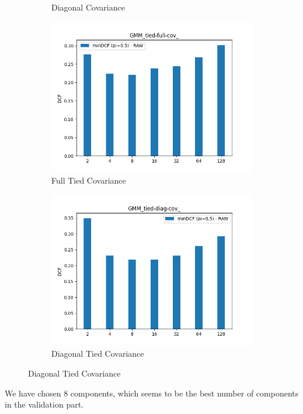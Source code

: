 \documentclass[english]{report}
\begin{document}
\begin{figure}[h!]
\begin{subfigure}{0.3\textwidth}
        \caption{Diagonal Covariance}
    \end{subfigure}
    \begin{subfigure}{0.3\textwidth}
        \includegraphics[scale=0.3]{../../images/evaluation/GMM_tied-full-cov_component_comparison.png}
        \caption{Full Tied Covariance}
    \end{subfigure}
    \begin{subfigure}{0.3\textwidth}
        \includegraphics[scale=0.3]{../../images/evaluation/GMM_tied-diag-cov_component_comparison.png}
        \caption{Diagonal Tied Covariance}
    \end{subfigure}
    \centering
\end{figure}
We have chosen 8 components, which seems to be the best number of components in the validation part.
\newline
\end{document}

